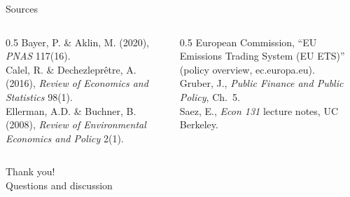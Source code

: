 \documentclass[11pt,aspectratio=169]{beamer}
\begin{document}
\begin{frame}{Sources}
  \tiny
  \begin{columns}[T]
    \begin{column}{0.5\textwidth}
      Bayer, P. \& Aklin, M. (2020), \emph{PNAS} 117(16).\\
      Calel, R. \& Dechezleprêtre, A. (2016), \emph{Review of Economics and Statistics} 98(1).\\
      Ellerman, A.D. \& Buchner, B. (2008), \emph{Review of Environmental Economics and Policy} 2(1).
    \end{column}
    \begin{column}{0.5\textwidth}
      European Commission, ``EU Emissions Trading System (EU ETS)'' (policy overview, ec.europa.eu).\\
      Gruber, J., \emph{Public Finance and Public Policy}, Ch.\ 5.\\
      Saez, E., \emph{Econ 131} lecture notes, UC Berkeley.
    \end{column}
  \end{columns}
\end{frame}

\begin{frame}[standout]
  Thank you!\\
  \vspace{0.5em}
  \small Questions and discussion
\end{frame}
\end{document}
